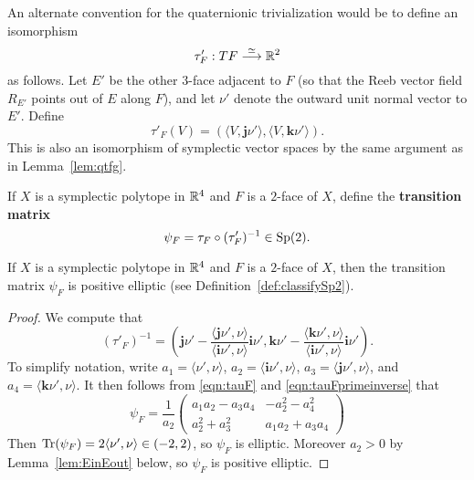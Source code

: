 \begin{remark}
\label{rem:altcon}
An alternate convention for the quaternionic trivialization would be to define an isomorphism
 \[
\tau'_F: TF \stackrel{\simeq}{\longrightarrow} {\mathbb R}^2
\]
as follows. Let $E'$ be the other $3$-face adjacent to $F$ (so that the Reeb vector field $R_{E'}$ points out of $E$ along $F$), and let $\nu'$ denote the outward unit normal vector to $E'$. Define
\[
\tau'_F(V) = (\langle V,{\mathbf j}\nu'\rangle, \langle V,{\mathbf k}\nu'\rangle).
\]
This is also an isomorphism of symplectic vector spaces by the same argument as in Lemma~\ref{lem:qtfg}.
\end{remark}

\begin{definition}
\label{def:transitionmatrix}
If $X$ is a symplectic polytope in ${\mathbb R}^4$ and $F$ is a $2$-face of $X$, define the {\bf transition matrix\/}
\[
\psi_F = \tau_F\circ (\tau_F')^{-1}\in\operatorname{Sp}(2).
\]
\end{definition}

\begin{lemma}
\label{lem:transitionmatrix}
If $X$ is a symplectic polytope in ${\mathbb R}^4$ and $F$ is a $2$-face of $X$, then the transition matrix $\psi_F$ is positive elliptic (see Definition~\ref{def:classifySp2}).
\end{lemma}

\begin{proof}
We compute that
\begin{equation}
\label{eqn:tauFprimeinverse}
(\tau'_F)^{-1} = \left( {\mathbf j}\nu' - \frac{\langle {\mathbf j}\nu',\nu\rangle}{\langle {\mathbf i}\nu',\nu\rangle}{\mathbf i}\nu', {\mathbf k}\nu' - \frac{\langle {\mathbf k}\nu',\nu\rangle}{\langle {\mathbf i}\nu',\nu\rangle}{\mathbf i}\nu'\right).
\end{equation}
To simplify notation, write $a_1 = \langle \nu',\nu\rangle$, $a_2=\langle {\mathbf i}\nu',\nu\rangle$, $a_3=\langle {\mathbf j}\nu',\nu\rangle$, and $a_4=\langle {\mathbf k}\nu',\nu\rangle$. It then follows from \eqref{eqn:tauF} and \eqref{eqn:tauFprimeinverse} that
\[
\psi_F = \frac{1}{a_2} \begin{pmatrix}
a_1a_2 - a_3a_4 & -a_2^2 -a_4^2\\ a_2^2 + a_3^2 & a_1a_2 + a_3a_4 
\end{pmatrix}
\]
Then $\operatorname{Tr}(\psi_F) = 2\langle \nu',\nu\rangle \in (-2,2)$, so $\psi_F$ is elliptic. Moreover $a_2>0$ by Lemma~\ref{lem:EinEout} below, so $\psi_F$ is positive elliptic.
\end{proof}


